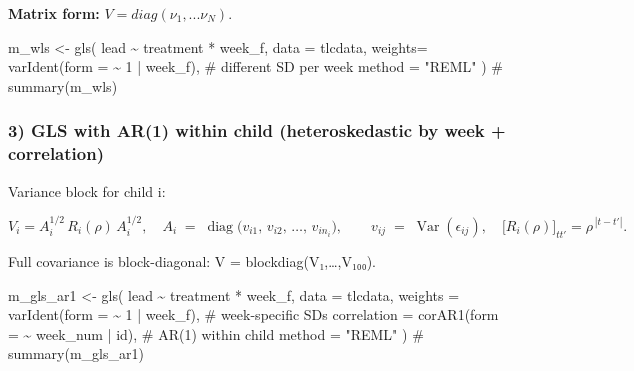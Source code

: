 \documentclass[
  letterpaper,
  DIV=11,
  numbers=noendperiod]{scrreprt}
\newenvironment{Shaded}{\begin{snugshade}}{\end{snugshade}}
\newcommand{\AttributeTok}[1]{\textcolor[rgb]{0.40,0.45,0.13}{#1}}
\newcommand{\CommentTok}[1]{\textcolor[rgb]{0.37,0.37,0.37}{#1}}
\newcommand{\DecValTok}[1]{\textcolor[rgb]{0.68,0.00,0.00}{#1}}
\newcommand{\FunctionTok}[1]{\textcolor[rgb]{0.28,0.35,0.67}{#1}}
\newcommand{\NormalTok}[1]{\textcolor[rgb]{0.00,0.23,0.31}{#1}}
\newcommand{\OtherTok}[1]{\textcolor[rgb]{0.00,0.23,0.31}{#1}}
\newcommand{\SpecialCharTok}[1]{\textcolor[rgb]{0.37,0.37,0.37}{#1}}
\newcommand{\StringTok}[1]{\textcolor[rgb]{0.13,0.47,0.30}{#1}}
\begin{document}
\textbf{Matrix form:} \(V = diag(\nu_1, ... \nu_N)\).

\begin{Shaded}
\begin{Highlighting}[]
\NormalTok{m\_wls }\OtherTok{\textless{}{-}} \FunctionTok{gls}\NormalTok{(}
\NormalTok{  lead }\SpecialCharTok{\textasciitilde{}}\NormalTok{ treatment }\SpecialCharTok{*}\NormalTok{ week\_f,}
  \AttributeTok{data   =}\NormalTok{ tlcdata,}
  \AttributeTok{weights=} \FunctionTok{varIdent}\NormalTok{(}\AttributeTok{form =} \SpecialCharTok{\textasciitilde{}} \DecValTok{1} \SpecialCharTok{|}\NormalTok{ week\_f),   }\CommentTok{\# different SD per week}
  \AttributeTok{method =} \StringTok{"REML"}
\NormalTok{)}
\CommentTok{\# summary(m\_wls)}
\end{Highlighting}
\end{Shaded}

\hypertarget{gls-with-ar1-within-child-heteroskedastic-by-week-correlation}{%
\subsubsection*{3) GLS with AR(1) within child (heteroskedastic by week
+
correlation)}\label{gls-with-ar1-within-child-heteroskedastic-by-week-correlation}}

Variance block for child i:

\[
V_i = A_i^{1/2}\,R_i(\rho)\,A_i^{1/2},\quad
A_i \;=\; \operatorname{diag}\!\big( v_{i1},\, v_{i2},\, \ldots,\, v_{i n_i} \big),
\qquad v_{ij} \;=\; \operatorname{Var}(\epsilon_{ij}), \quad 
\big[R_i(\rho)\big]_{tt'}=\rho^{\,|t-t'|}.
\]

Full covariance is block-diagonal: V = blockdiag(V₁,\ldots,V₁₀₀).

\begin{Shaded}
\begin{Highlighting}[]
\NormalTok{m\_gls\_ar1 }\OtherTok{\textless{}{-}} \FunctionTok{gls}\NormalTok{(}
\NormalTok{  lead }\SpecialCharTok{\textasciitilde{}}\NormalTok{ treatment }\SpecialCharTok{*}\NormalTok{ week\_f,}
  \AttributeTok{data        =}\NormalTok{ tlcdata,}
  \AttributeTok{weights     =} \FunctionTok{varIdent}\NormalTok{(}\AttributeTok{form =} \SpecialCharTok{\textasciitilde{}} \DecValTok{1} \SpecialCharTok{|}\NormalTok{ week\_f),      }\CommentTok{\# week{-}specific SDs}
  \AttributeTok{correlation =} \FunctionTok{corAR1}\NormalTok{(}\AttributeTok{form =} \SpecialCharTok{\textasciitilde{}}\NormalTok{ week\_num }\SpecialCharTok{|}\NormalTok{ id),     }\CommentTok{\# AR(1) within child}
  \AttributeTok{method      =} \StringTok{"REML"}
\NormalTok{)}
\CommentTok{\# summary(m\_gls\_ar1)}
\end{Highlighting}
\end{Shaded}
\end{document}
